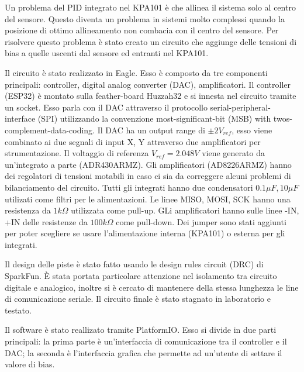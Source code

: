 Un problema del PID integrato nel KPA101 è che allinea il sistema solo al centro del sensore. Questo diventa un problema in sistemi molto complessi quando la posizione di ottimo allineamento non combacia con il centro del sensore. Per risolvere questo problema è stato creato un circuito che aggiunge delle tensioni di bias a quelle uscenti dal sensore ed entranti nel KPA101.

Il circuito è stato realizzato in Eagle. Esso è composto da tre componenti principali: controller, digital analog converter (DAC), amplificatori.
Il controller (ESP32) è montato sulla feather-board Huzzah32 e si innesta nel circuito tramite un socket. Esso parla con il DAC attraverso il protocollo serial-peripheral-interface (SPI) utilizzando la convenzione most-significant-bit (MSB) with twos-complement-data-coding.
Il DAC ha un output range di $\pm 2 V_{ref}$, esso viene combinato ai due segnali di input X, Y attraverso due amplificatori per strumentazione. Il voltaggio di referenza $V_{ref} = 2.048V$ viene generato da un'integrato a parte (ADR430ARMZ).
Gli amplificatori (AD8226ARMZ) hanno dei regolatori di tensioni motabili in caso ci sia da correggere alcuni problemi di bilanciamento del circuito. Tutti gli integrati hanno due condensatori $0.1 \mu F, 10 \mu F$ utilizati come filtri per le alimentazioni. Le linee MISO, MOSI, SCK hanno una resistenza da $1 k\Omega$ utilizzata come pull-up. GLi amplificatori hanno sulle linee -IN, +IN delle resistenze da $100 k\Omega$ come pull-down. Dei jumper sono stati aggiunti per poter scegliere se usare l'alimentazione interna (KPA101) o esterna per gli integrati.

Il design delle piste è stato fatto usando le design rules circuit (DRC) di SparkFun. È stata portata particolare attenzione nel isolamento tra circuito digitale e analogico, inoltre si è cercato di mantenere della stessa lunghezza le line di comunicazione seriale. Il circuito finale è stato stagnato in laboratorio e testato.

Il software è stato reallizato tramite PlatformIO. Esso si divide in due parti principali: la prima parte è un'interfaccia di comunicazione tra il controller e il DAC; la seconda è l'interfaccia grafica che permette ad un'utente di settare il valore di bias.

